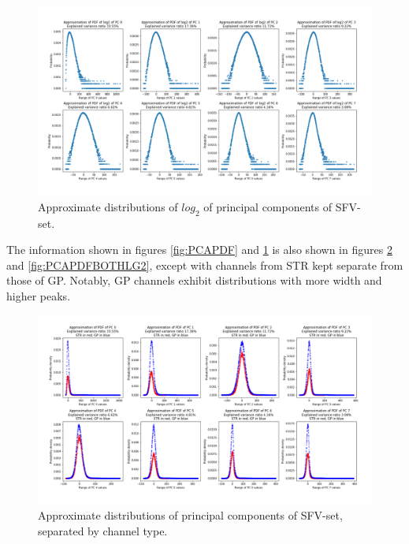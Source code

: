 \documentclass{article}
\begin{document}
\begin{figure}[H]
    \centering
    \centerline{\includegraphics[width=1\textwidth]{images/PCA/PCAPDFLG2.png}}
    \caption{Approximate distributions of \begin{math}log_2\end{math} of principal components of SFV-set.}
    \label{fig:PCAPDFLG2}
\end{figure}

The information shown in figures \ref{fig:PCAPDF} and \ref{fig:PCAPDFLG2} is also shown in figures \ref{fig:PCAPDFBOTH} and \ref{fig:PCAPDFBOTHLG2}, except with channels from STR kept separate from those of GP.
Notably, GP channels exhibit distributions with more width and higher peaks.

\begin{figure}[H]
    \centering
    \centerline{\includegraphics[width=1\textwidth]{images/PCA/PCABOTH.png}}
    \caption{Approximate distributions of principal components of SFV-set, separated by channel type.}
    \label{fig:PCAPDFBOTH}
\end{figure}
\end{document}

